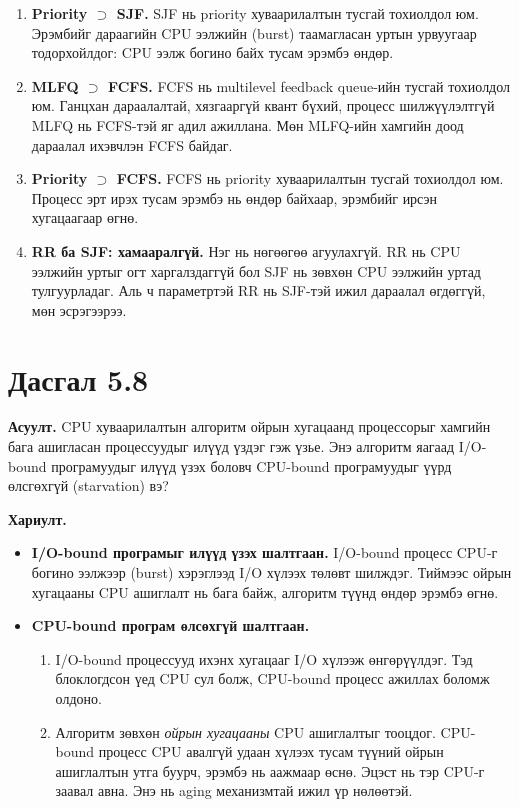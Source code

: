 \documentclass[12pt,a4paper]{article}
\newcommand{\question}[2]{\section{Дасгал #1}\textbf{Асуулт.} #2\par\medskip\textbf{Хариулт.}\par}
\begin{document}
\begin{enumerate}[label=(\alph*), leftmargin=1.5em]
  \item \textbf{Priority $\supset$ SJF.} SJF нь priority хуваарилалтын тусгай тохиолдол юм. Эрэмбийг дараагийн CPU ээлжийн (burst) таамагласан уртын урвуугаар тодорхойлдог: CPU ээлж богино байх тусам эрэмбэ өндөр.
  \item \textbf{MLFQ $\supset$ FCFS.} FCFS нь multilevel feedback queue-ийн тусгай тохиолдол юм. Ганцхан дараалалтай, хязгааргүй квант бүхий, процесс шилжүүлэлтгүй MLFQ нь FCFS-тэй яг адил ажиллана. Мөн MLFQ-ийн хамгийн доод дараалал ихэвчлэн FCFS байдаг.
  \item \textbf{Priority $\supset$ FCFS.} FCFS нь priority хуваарилалтын тусгай тохиолдол юм. Процесс эрт ирэх тусам эрэмбэ нь өндөр байхаар, эрэмбийг ирсэн хугацаагаар өгнө.
  \item \textbf{RR ба SJF: хамааралгүй.} Нэг нь нөгөөгөө агуулахгүй. RR нь CPU ээлжийн уртыг огт харгалздаггүй бол SJF нь зөвхөн CPU ээлжийн уртад тулгуурладаг. Аль ч параметртэй RR нь SJF-тэй ижил дараалал өгдөггүй, мөн эсрэгээрээ.
\end{enumerate}

\question{5.8}{CPU хуваарилалтын алгоритм ойрын хугацаанд процессорыг хамгийн бага ашигласан процессуудыг илүүд үздэг гэж үзье. Энэ алгоритм яагаад I/O-bound програмуудыг илүүд үзэх боловч CPU-bound програмуудыг үүрд өлсгөхгүй (starvation) вэ?}

\begin{itemize}[leftmargin=1.5em]
  \item \textbf{I/O-bound програмыг илүүд үзэх шалтгаан.} I/O-bound процесс CPU-г богино ээлжээр (burst) хэрэглээд I/O хүлээх төлөвт шилждэг. Тиймээс ойрын хугацааны CPU ашиглалт нь бага байж, алгоритм түүнд өндөр эрэмбэ өгнө.
  \item \textbf{CPU-bound програм өлсөхгүй шалтгаан.}
  \begin{enumerate}[leftmargin=1.5em]
    \item I/O-bound процессууд ихэнх хугацааг I/O хүлээж өнгөрүүлдэг. Тэд блоклогдсон үед CPU сул болж, CPU-bound процесс ажиллах боломж олдоно.
    \item Алгоритм зөвхөн \emph{ойрын хугацааны} CPU ашиглалтыг тооцдог. CPU-bound процесс CPU авалгүй удаан хүлээх тусам түүний ойрын ашиглалтын утга буурч, эрэмбэ нь аажмаар өснө. Эцэст нь тэр CPU-г заавал авна. Энэ нь aging механизмтай ижил үр нөлөөтэй.
  \end{enumerate}
\end{itemize}
\end{document}
